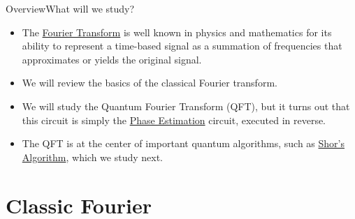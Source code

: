 \def\OtherAuthors{, Magnus~Dunn, Kaden~Bernhard, Elisabeth~Belanger, Eric~Jia}

\begin{frame}{Overview}{What will we study?}

\begin{itemize}
    \item The \href{https://en.wikipedia.org/wiki/Fourier_transform}{Fourier Transform} is well known in physics and mathematics for its ability to represent a time-based signal as a summation of frequencies that approximates or yields the original signal.
    \item We will review the basics of the classical Fourier transform.
    \item We will study the Quantum Fourier Transform (QFT), but it turns out that this circuit is simply the \href{https://en.wikipedia.org/wiki/Quantum_phase_estimation_algorithm}{Phase Estimation} circuit, executed in reverse.
    \item The QFT is at the center of important quantum algorithms, such as \href{https://en.wikipedia.org/wiki/Shor\%27s_algorithm}{Shor's Algorithm}, which we study next.
\end{itemize}
\end{frame}

\section*{Classic Fourier}

